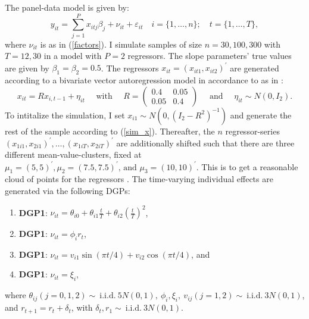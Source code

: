 The panel-data model is given by:
\begin{equation}\label{sim_model}
y_{i t}= \sum_{j =1}^P x_{itj} \beta_j + \nu_{it} + \varepsilon_{i t} \quad i=\{1, \ldots, n\} ; \quad t=\{1, \ldots, T\},
\end{equation}
where $\nu_{it}$ is as in (\ref{factors}). I simulate samples of size $n=30,100,300$ with $T = 12,30$ in a model with $P = 2$ regressors. The slope parameters' true values are given by $\beta_1=\beta_2=0.5$. The regressors $x_{it} = (x_{it1}, x_{it2})^\prime$ are generated according to a bivariate vector autoregression model in accordance to \citet{park2003semiparametric, park2007semiparametric} as in \citet{kneip2012new}:
\begin{equation}\label{sim_x}
x_{i t}=R x_{i, t-1}+\eta_{i t} \quad \text { with } \quad R=\left(\begin{array}{cc}
0.4 & 0.05 \\
0.05 & 0.4
\end{array}\right) \quad \text { and } \quad \eta_{i t} \sim N\left(0, I_2\right).
\end{equation}
To intitalize the simulation, I set $x_{i1} \sim N(0, (I_2 - R^2)^{-1})$ and generate the rest of the sample according to (\ref{sim_x}). Thereafter, the $n$ regressor-series $\left(x_{1 i 1}, x_{2 i 1}\right)^{\prime}, \ldots,\left(x_{1 i T}, x_{2 i T}\right)^{\prime}$ are additionally shifted such that there are three different mean-value-clusters, fixed at $ \mu_1=(5,5)^{\prime}, \mu_2=(7.5,7.5)^{\prime} \text {, and } \mu_3=(10,10)^{\prime}$. This is to get a reasonable cloud of points for the regressors \citep{park2003semiparametric, park2007semiparametric, kneip2012new}. The time-varying individual effects are generated via the following \ac{DGPs}:
\begin{enumerate}
\item\textbf{\acs{DGP}1}: $\nu_{it}=\theta_{i0}+\theta_{i1}\frac{t}{T}+\theta_{i2}\left(\frac{t}{T}\right)^2$,
\item\textbf{\acs{DGP}1}: $\nu_{it}=\phi_i r_t$,
\item\textbf{\acs{DGP}1}: $\nu_{it}=v_{i1} \sin (\pi t / 4) +v_{i2} \cos (\pi t / 4)$, and
\item\textbf{\acs{DGP}1}: $\nu_{it}=\xi_i$,
\end{enumerate}

where $\theta_{i j}(j=0,1,2) \sim \: \text{i.i.d.} \: 5N(0,1),\: \phi_i, \xi_i, \: v_{i j}(j=1,2) \sim \: \text{i.i.d.} \: 3N(0,1)$, and $r_{t+1} = r_t + \delta_t$, with $\delta_t, r_1 \sim \: \text{i.i.d.} \: 3N(0,1)$. 


